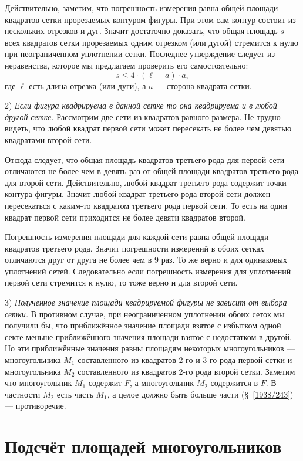 \documentclass[twoside]{book}
\begin{document}
Действительно, заметим, что погрешность измерения равна общей площади квадратов сетки прорезаемых контуром фигуры.
При этом сам контур состоит из нескольких отрезков и дуг.
Значит достаточно доказать, что общая площадь $s$ всех квадратов сетки прорезаемых одним отрезком (или дугой) стремится к нулю при неограниченном уплотнении сетки.
Последнее утверждение следует из неравенства, которое мы предлагаем проверить его самостоятельно:
\[s\le 4\cdot (\ell+a)\cdot a,\]
где $\ell$ есть длина отрезка (или дуги), а $a$ --- сторона квадрата сетки.

2) \emph{Если фигура квадрируема в данной сетке то она квадрируема и в любой другой сетке.}
Рассмотрим две сети из квадратов равного размера.
Не трудно видеть, что любой квадрат первой сети 
может пересекать не более чем девятью квадратами второй сети.

Отсюда следует, что общая площадь квадратов третьего рода для первой сети  отличаются не более чем в девять раз от общей площади квадратов третьего рода для второй сети.
Действительно, любой квадрат третьего рода содержит точки контура фигуры.
Значит любой квадрат третьего рода второй сети должен пересекаться с каким-то квадратом третьего рода первой сети.
То есть на один квадрат первой сети приходится не более девяти квадратов второй.


Погрешность измерения площади для каждой сети равна общей площади квадратов третьего рода.
Значит погрешности измерений в обоих сетках отличаются друг от друга не более чем в 9 раз.
То же верно и для одинаковых уплотнений сетей.
Следовательно если погрешность измерения для уплотнений первой сети стремится к нулю, то тоже верно и для второй сети. 

3) \emph{Полученное значение площади квадрируемой фигуры не зависит от выбора сетки.}
В противном случае, при неограниченном уплотнении обоих сеток мы получили бы, что
приближённое значение площади взятое с избытком одной секте меньше 
приближённого значения площади взятое с недостатком в другой.
Но эти приближённые значения равны площадям некоторых многоугольников --- многоугольника $M_1$ составленного из квадратов 2-го и 3-го рода первой сетки 
и многоугольника $M_2$ составленного из квадратов 2-го рода второй сетки.
Заметим что многоугольник $M_1$ содержит $F$, а многоугольник $M_2$ содержится в $F$.
В частности $M_2$ есть часть $M_1$, а целое должно быть больше части (§~\ref{1938/243}) --- противоречие.


\section{Подсчёт площадей многоугольников}
\end{document}
